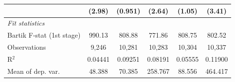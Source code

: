 \begin{tabular}{lccccc}
                                                                         & (2.98)                        & (0.951)                     & (2.64)                          & (1.05)                        & (3.41)\\   
   \midrule
   \emph{Fit statistics}\\
   Bartik F-stat (1st stage)                                     & 990.13                        & 808.88                      & 771.86                          & 808.75                        & 802.52\\  
   Observations                                                          & 9,246                         & 10,281                      & 10,283                          & 10,304                        & 10,337\\  
   R$^2$                                                                 & 0.04441                       & 0.09251                     & 0.08191                         & 0.05555                       & 0.11900\\  
   Mean of dep. var.                                                     & 48.388                        & 70.385                      & 258.767                         & 88.556                        & 464.417\\  
\bottomrule
\end{tabular}
